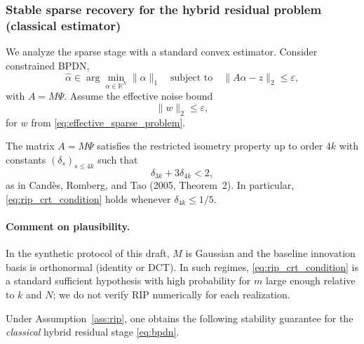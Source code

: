 \subsubsection{Stable sparse recovery for the hybrid residual problem (classical estimator)}

We analyze the sparse stage with a standard convex estimator.
Consider constrained BPDN,
\begin{equation}
  \widehat{\alpha}
  \in
  \arg\min_{\alpha\in\mathbb{R}^N} \|\alpha\|_1
  \quad
  \text{subject to}
  \quad
  \|A\alpha-z\|_2 \le \varepsilon,
  \label{eq:bpdn}
\end{equation}
with $A=M\Psi$.
Assume the effective noise bound
\begin{equation}
  \|w\|_2 \le \varepsilon,
  \label{eq:noise_bound}
\end{equation}
for $w$ from \eqref{eq:effective_sparse_problem}.

\begin{assumption}
\label{ass:rip}
The matrix $A=M\Psi$ satisfies the restricted isometry property up to order $4k$ with constants $(\delta_s)_{s\le 4k}$ such that
\begin{equation}
  \delta_{3k} + 3\delta_{4k} < 2,
  \label{eq:rip_crt_condition}
\end{equation}
as in Cand\`es, Romberg, and Tao (2005, Theorem~2).
In particular, \eqref{eq:rip_crt_condition} holds whenever $\delta_{4k}\le 1/5$.
\end{assumption}

\paragraph{Comment on plausibility.}
In the synthetic protocol of this draft, $M$ is Gaussian and the baseline innovation basis is orthonormal (identity or DCT).
In such regimes, \eqref{eq:rip_crt_condition} is a standard sufficient hypothesis with high probability for $m$ large enough relative to $k$ and $N$; we do not verify RIP numerically for each realization.

Under Assumption~\ref{ass:rip}, one obtains the following stability guarantee for the \emph{classical} hybrid residual stage \eqref{eq:bpdn}.

